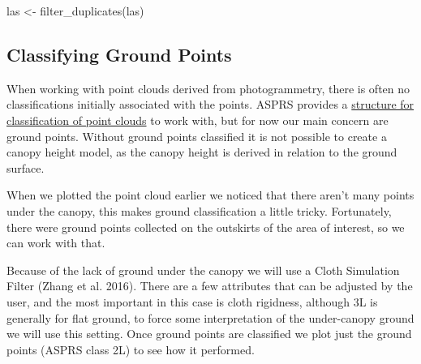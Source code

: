 \documentclass[
]{article}
\newenvironment{Shaded}{\begin{snugshade}}{\end{snugshade}}
\newcommand{\AttributeTok}[1]{\textcolor[rgb]{0.77,0.63,0.00}{#1}}
\newcommand{\DocumentationTok}[1]{\textcolor[rgb]{0.56,0.35,0.01}{\textbf{\textit{#1}}}}
\newcommand{\FunctionTok}[1]{\textcolor[rgb]{0.00,0.00,0.00}{#1}}
\newcommand{\NormalTok}[1]{#1}
\newcommand{\OtherTok}[1]{\textcolor[rgb]{0.56,0.35,0.01}{#1}}
\begin{document}
\begin{Shaded}
\begin{Highlighting}[]
\NormalTok{las }\OtherTok{\textless{}{-}} \FunctionTok{filter\_duplicates}\NormalTok{(las)}
\end{Highlighting}
\end{Shaded}

\hypertarget{classifying-ground-points}{%
\subsection{Classifying Ground Points}\label{classifying-ground-points}}

When working with point clouds derived from photogrammetry, there is
often no classifications initially associated with the points. ASPRS
provides a
\href{chrome-extension://efaidnbmnnnibpcajpcglclefindmkaj/viewer.html?pdfurl=https\%3A\%2F\%2Fwww.asprs.org\%2Fwp-content\%2Fuploads\%2F2010\%2F12\%2FLAS_Specification.pdf\&clen=3783348\&chunk=true}{structure
for classification of point clouds} to work with, but for now our main
concern are ground points. Without ground points classified it is not
possible to create a canopy height model, as the canopy height is
derived in relation to the ground surface.

When we plotted the point cloud earlier we noticed that there aren't
many points under the canopy, this makes ground classification a little
tricky. Fortunately, there were ground points collected on the outskirts
of the area of interest, so we can work with that.

Because of the lack of ground under the canopy we will use a Cloth
Simulation Filter (Zhang et al. 2016). There are a few attributes that
can be adjusted by the user, and the most important in this case is
cloth rigidness, although 3L is generally for flat ground, to force some
interpretation of the under-canopy ground we will use this setting. Once
ground points are classified we plot just the ground points (ASPRS class
2L) to see how it performed.

\begin{Shaded}
\end{Shaded}
\end{document}
